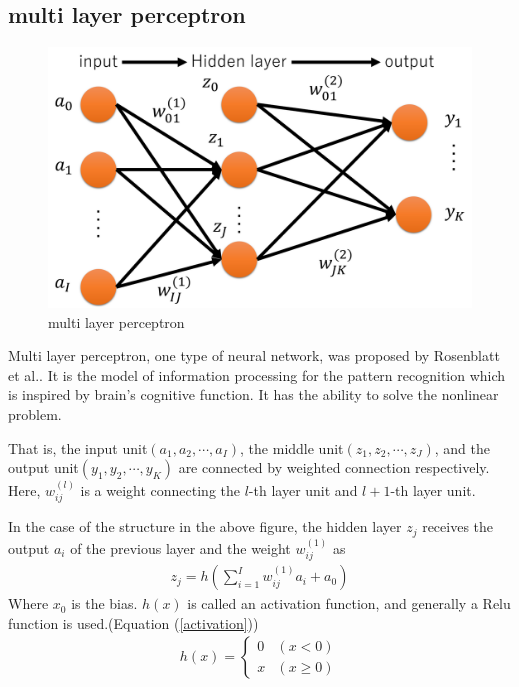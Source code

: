 \documentclass[a4paper,12pt]{article}
\begin{document}
\subsection{multi layer perceptron}
\begin{figure}[ht]
\begin{center}
\includegraphics[scale=0.5]{figure4.png}
\caption{multi layer perceptron}
\end{center}
\end{figure}
Multi layer perceptron, one type of neural network, was proposed by Rosenblatt et al.\cite{Rosenblatt1958}. It is the model of information processing for the pattern recognition which is inspired by brain’s cognitive function. It has the ability to solve the nonlinear problem. \par
That is, the input unit$(a_1, a_2, \cdots, a_I)$, the middle unit$(z_1, z_2, \cdots, z_J)$, and the output unit$(y_1, y_2, \cdots, y_K)$ are connected by weighted connection respectively. Here, $w^{(l)}_{ij}$ is a weight connecting the $l$-th layer unit and $l+1$-th layer unit. \par
In the case of the structure in the above figure, the hidden layer $z_j$ receives the output $a_i$ of the previous layer and the weight $w^{(1)}_{ij}$ as
\begin{align}
z_j=h(\sum_{i=1}^I{w_{ij}^{(1)}}a_i+a_0)
\end{align}
Where $x_0$ is the bias. $h(x)$ is called an activation function, and generally a Relu function is used.(Equation (\ref{activation}))
\begin{eqnarray} \label{activation}
h(x)=\left\{
\begin{array}{ll}
0 & (x<0) \\
x & (x \geq 0)
\end{array}
\right.
\end{eqnarray} \par
\end{document}
